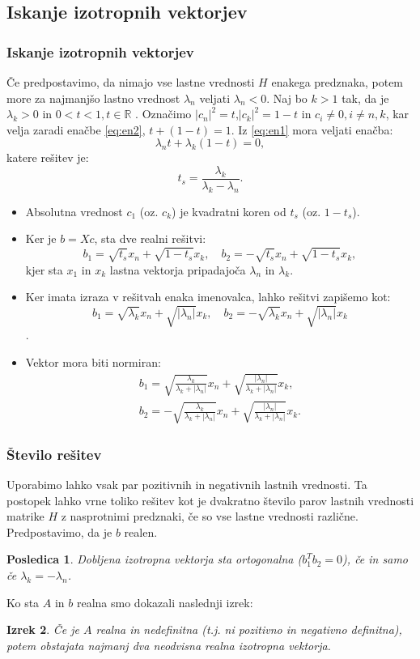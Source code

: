 \documentclass{beamer}
\newcommand{\abs}[1]{ \left\lvert#1\right\rvert}
\newcommand{\R}{\mathbb R}
\newtheorem{izrek}{Izrek}
\newtheorem{posledica}[izrek]{Posledica}
\begin{document}
\subsection{Iskanje izotropnih vektorjev}
\begin{frame}
\frametitle{Iskanje izotropnih vektorjev}
\begin{block}{}
Če predpostavimo, da nimajo vse lastne vrednosti $H$ enakega predznaka, potem more za najmanjšo lastno vrednost $\lambda_n$ veljati $\lambda_n <0$. 
 Naj bo $k>1$ tak, da je $\lambda_k >0$ in $0<t<1, t\in \R$ .  Označimo $\abs{c_n}^2 =t$,$\abs{c_k}^2=1-t$ in $c_i \not =0, i\not=n,k$, kar velja zaradi enačbe \eqref{eq:en2}, $t+ (1-t)=1$. Iz \eqref{eq:en1} mora veljati enačba: $$\lambda_n t +\lambda_k (1-t)=0,$$ katere rešitev je:
\begin{equation}
t_s=\frac{\lambda_k}{\lambda_k -\lambda_n}.
\end{equation}
\end{block}
\end{frame}
\begin{frame}
\begin{itemize}
\item Absolutna vrednost $c_1$ (oz. $c_k$) je kvadratni koren od $t_s$ (oz. $1-t_s$).\pause
\item Ker je $b=Xc$, sta dve realni rešitvi: $$b_1=\sqrt{t_s}x_n +\sqrt{1-t_s}x_k,\quad b_2=-\sqrt{t_s}x_n+\sqrt{1-t_s}x_k,$$ kjer sta $x_1$ in $x_k$ lastna vektorja pripadajoča  $\lambda_n$ in $\lambda_k$.\pause
\item Ker imata izraza v rešitvah enaka imenovalca, lahko rešitvi zapišemo kot: $$b_1=\sqrt{\lambda_k}x_n+\sqrt{\abs{\lambda_n}}x_k, \quad b_2=-\sqrt{\lambda_k}x_n+\sqrt{\abs{\lambda_n}}x_k$$.\pause
\item Vektor mora biti normiran:
\begin{align*}
b_1=\sqrt{\frac{\lambda_k}{\lambda_k +\abs{\lambda_n}}}x_n + \sqrt{\frac{\abs{\lambda_n}}{\lambda_k +\abs{\lambda_n}}}x_k,\\ b_2=-\sqrt{\frac{\lambda_k}{\lambda_k +\abs{\lambda_n}}}x_n + \sqrt{\frac{\abs{\lambda_n}}{\lambda_k +\abs{\lambda_n}}}x_k.
\end{align*}
\end{itemize}
\end{frame}
\begin{frame}
\frametitle{Število rešitev}
Uporabimo lahko vsak par pozitivnih in negativnih lastnih vrednosti. Ta postopek lahko vrne toliko rešitev kot je dvakratno število parov lastnih vrednosti matrike $H$ z nasprotnimi predznaki, če so vse lastne vrednosti različne. Predpostavimo, da je $b$ realen.\pause
\begin{posledica}%
Dobljena izotropna vektorja sta ortogonalna ($b_1 ^T b_2=0$), če in samo če $\lambda_k=-\lambda_n$.
\end{posledica}\pause
Ko sta $A$ in $b$ realna smo dokazali naslednji izrek:
\begin{izrek}
Če je $A$ realna in nedefinitna (t.j. ni pozitivno in negativno definitna), potem obstajata najmanj dva neodvisna realna izotropna vektorja.
\end{izrek}
\end{frame}
\end{document}
